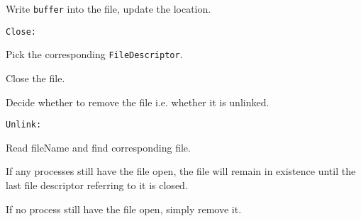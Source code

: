 \documentclass{article}
\begin{document}
\begin{compactitem}
\begin{compactitem}
		\item Write \texttt{buffer} into the file, update the location.
	\end{compactitem}
\item \texttt{Close:}
	\begin{compactitem}
		\item Pick the corresponding \texttt{FileDescriptor}.
		\item Close the file.
		\item Decide whether to remove the file i.e. whether it is unlinked.
	\end{compactitem}
\item \texttt{Unlink:}
	\begin{compactitem}
		\item Read fileName and find corresponding file.
		\item If any processes still have the file open, the file will remain in existence until the last file descriptor referring to it is closed.
		\item If no process still have the file open, simply remove it.
	\end{compactitem}
\end{compactitem}
\end{document}
